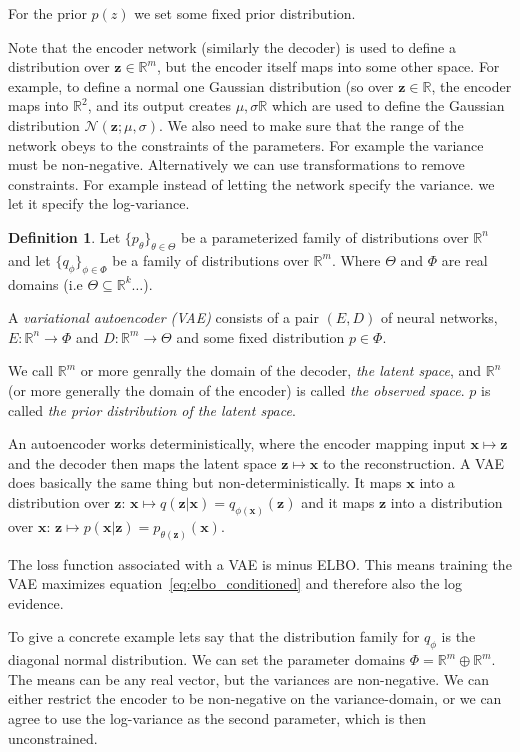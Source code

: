 \documentclass[11pt, a4paper]{report}
\theoremstyle{plain}
\theoremstyle{definition}
\newtheorem{mydef}{Definition}[chapter]
\theoremstyle{remark}
\newcommand{\R}{\mathbb{R}}
\newcommand{\x}{\mathbf{x}}
\newcommand{\z}{\mathbf{z}}
\begin{document}
For the prior $p(z)$ we set some fixed prior distribution.

Note that the encoder network (similarly the decoder) is used to define a distribution over
$\z \in \R^m$, but the encoder itself maps into some other space. 
For example,
to define a normal one Gaussian distribution (so over $\z \in \R$, the encoder
maps into $\R^2$, and its output creates $\mu, \sigma \R$ which are used to
define the Gaussian distribution $\mathcal{N}(\z ; \mu, \sigma)$.
We also need to make sure that the range of the network obeys to the constraints
of the parameters. For example the variance must be non-negative. 
Alternatively we can use transformations to remove constraints. For example
instead of letting the network specify the variance. we let it specify the
log-variance.

\begin{mydef}
\label{def:vae}
Let $\{p_{\theta}\}_{\theta \in \Theta}$ be a parameterized 
family of distributions over $\R^n$ and let
$\{q_{\phi}\}_{\phi \in \Phi}$ be a family of distributions over $\R^m$.
Where $\Theta$ and $\Phi$ are real domains (i.e $\Theta \subseteq \R^k \dots$).

A \emph{variational autoencoder (VAE)} consists of a pair $(E,D)$ of neural networks,
$E : \R^n \to \Phi$ and $D : \R^m \to \Theta$ and some fixed distribution $p \in
\Phi$.

We call $\R^m$ or more genrally the domain of the decoder, \emph{the latent
space}, and $\R^n$ (or more generally the domain of the encoder) is called
\emph{the observed space}.
$p$ is called \emph{the prior distribution of the latent space}.
\end{mydef}

An autoencoder works deterministically, where 
the encoder mapping input $\x \mapsto \z$ and the decoder then maps the
latent space $\z \mapsto \hat{\x}$ to the reconstruction. A VAE does
basically the same thing but non-deterministically.
It maps $\x$ into a distribution over $\z$: $\x \mapsto q(\z|\x) =
q_{\phi(\x)}(\z)$ and it maps
$\z$ into a distribution over $\x$: $\z \mapsto p(\x|\z) = p_{\theta(\z)}(\x)$.

The loss function associated with a VAE is minus ELBO. This means training
the VAE maximizes equation~\ref{eq:elbo_conditioned} and therefore also
the log evidence.

To give a concrete example lets say that the distribution family for $q_{\phi}$ 
is the diagonal normal distribution.
We can set the parameter domains $\Phi = \R^m \oplus \R^m$. The means can be any
real vector, but the variances are non-negative. We can either restrict the
encoder to be non-negative on the variance-domain, or we can agree to use the
log-variance as the second parameter, which is then unconstrained.
\end{document}
